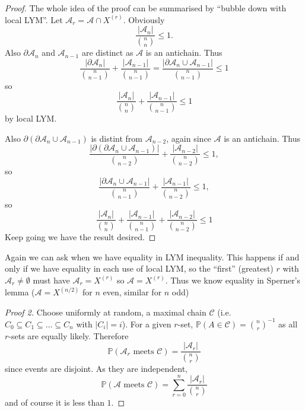 \documentclass[a4paper]{article}
\newcommand{\shadow}{\partial}
\renewcommand{\P}{\mathbb P}
\begin{document}
\begin{proof}
  The whole idea of the proof can be summarised by ``bubble down with local LYM''. Let \(\mathcal A_r = \mathcal A \cap X^{(r)}\). Obviously
  \[
    \frac{|\mathcal A_n|}{\binom{n}{n}} \leq 1.
  \]
  Also \(\shadow \mathcal A_n\) and \(\mathcal A_{n - 1}\) are distinct as \(\mathcal A\) is an antichain. Thus
  \[
    \frac{|\shadow \mathcal A_n|}{\binom{n}{n - 1}} + \frac{|\mathcal A_{n - 1}|}{\binom{n}{n - 1}}
    = \frac{|\shadow \mathcal A_n \cup \mathcal A_{n - 1}|}{\binom{n}{n - 1}} \leq 1
  \]
  so
  \[
    \frac{|\mathcal A_n|}{\binom{n}{n}} + \frac{|\mathcal A_{n - 1}|}{\binom{n}{n - 1}} \leq 1
  \]
  by local LYM.

  Also \(\shadow (\shadow \mathcal A_n \cup \mathcal A_{n - 1})\) is distint from \(\mathcal A_{n - 2}\), again since \(\mathcal A\) is an antichain. Thus
  \[
    \frac{|\shadow (\shadow \mathcal A_n \cup \mathcal A_{n -1})|}{\binom{n}{n - 2}} +\frac{|\mathcal A_{n - 2}|}{\binom{n}{n - 2}} \leq 1,
  \]
  so
  \[
    \frac{|\shadow \mathcal A_n \cup \mathcal A_{n - 1}|}{\binom{n}{n - 1}} + \frac{|\mathcal A_{n - 1}|}{\binom{n}{n - 2}} \leq 1,
  \]
  so
  \[
    \frac{|\mathcal A_n|}{\binom{n}{n}} + \frac{|\mathcal A_{n - 1}|}{\binom{n}{n - 1}} + \frac{|\mathcal A_{n - 2}|}{\binom{n}{n - 2}} \leq 1
  \]
  Keep going we have the result desired.
\end{proof}

Again we can ask when we have equality in LYM inequality. This happens if and only if we have equality in each use of local LYM, so the ``first'' (greatest) \(r\) with \(\mathcal A_r \neq \emptyset\) must have \(\mathcal A_r = X^{(r)}\) so \(\mathcal A = X^{(r)}\). Thus we know equality in Sperner's lemma (\(\mathcal A = X^{(n/2)}\) for \(n\) even, similar for \(n\) odd)

\begin{proof}[Proof 2]
  Choose uniformly at random, a maximal chain \(\mathcal C\) (i.e.\ \(C_0 \subseteq C_1 \subseteq \dots \subseteq C_n\) with \(|C_i| = i\)). For a given \(r\)-set, \(\P(A \in \mathcal C) = \binom{n}{r}^{-1}\) as all \(r\)-sets are equally likely. Therefore
  \[
    \P(\mathcal A_r \text{ meets } \mathcal C) = \frac{|\mathcal A_r|}{\binom{n}{r}}
  \]
  since events are disjoint. As they are independent,
  \[
    \P(\mathcal A \text{ meets } \mathcal C) = \sum_{r = 0}^n \frac{|\mathcal A_r|}{\binom{n}{r}}
  \]
  and of course it is less than \(1\).
\end{proof}

\end{document}
